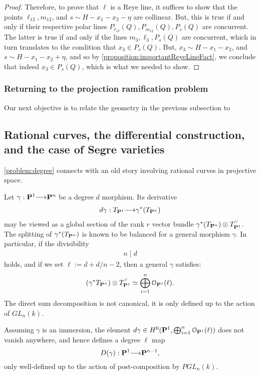 \documentclass[11pt,reqno]{amsart}
\theoremstyle{plain}
\theoremstyle{definition}
\theoremstyle{remark}
\numberwithin{equation}{section}
\renewcommand{\to}{{\longrightarrow}}
\numberwithin{equation}{section}
\renewcommand{\O}{\mathcal O}
\newcommand{\smvee}{\raise0.5ex\hbox{$\scriptscriptstyle\vee$}}
\begin{document}
\begin{proof}
Therefore, to prove that $\ell$ is a Reye line, it suffices to show that the points $\ell_{12}, m_{12}$, and $s \sim H-x_{1}-x_{2}-\eta$ are collinear.  But, this is true if and only if their respective polar lines $P_{\ell_{12}}(Q), P_{m_{12}}(Q), P_{s}(Q)$ are concurrent.  The latter is true if and only if the lines $m_{3}, \ell_{3}, P_{s}(Q)$ are concurrent, which in turn  translates to the condition that $x_{3} \in P_{s}(Q)$.  But, $x_{3} \sim H-x_{1}-x_{2}$, and $s \sim H-x_{1}-x_{2}+\eta$, and so by \autoref{proposition:importantReyeLineFact}, we conclude that indeed $x_{3} \in P_{s}(Q)$, which is what we needed to show.
\end{proof}

\subsubsection{Returning to the projection ramification problem} Our next objective is to relate the geometry in the previous subsection to 



\subsection{Rational curves, the differential construction, and the case of Segre varieties} %
\label{sec:rational_curves_in_projective_space}
\autoref{problem:degree} connects with an old story involving rational curves in projective space.  

Let $\gamma: \P^{1} \to \P^{n}$ be a degree $d$ morphism. Its derivative 
\begin{align*}
    d\gamma:T_{\P^{1}} \to \gamma^{*}(T_{\P^{n}})
  \end{align*}  
may be viewed as a global section of the rank $r$ vector bundle $\gamma^{*}(T_{\P^{n}}) \otimes T_{\P^{1}}^{\smvee}$.  The splitting of $\gamma^{*}(T_{\P^{n}})$ is known to be balanced for a general morphism $\gamma$. In particular, if the divisibility
\begin{align*}
  n \mid d
\end{align*}
holds, and if we set $\ell := d+d/n-2$, then a general $\gamma$ satisfies: 
\begin{align*}
  (\gamma^{*}T_{\P^{n}}) \otimes T_{\P^{1}}^{\smvee} \simeq \bigoplus_{i=1}^{n} \O_{\P^{1}}(\ell).
\end{align*} 
The direct sum decomposition is not canonical, it is only defined up to the
action of $GL_{n}(k)$.  

Assuming $\gamma$ is an immersion, the element $d \gamma \in
H^{0}(\P^{1},\bigoplus_{i=1}^{n} \O_{\P^{1}}(\ell))$ does not vanish anywhere,
and hence defines a degree $\ell$ map $$D(\gamma) : \P^{1} \to \P^{n-1},$$
only well-defined up to the action of post-composition by $PGL_{n}(k)$. 
\end{document}
